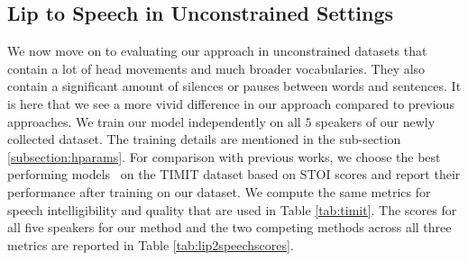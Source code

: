 \documentclass[10pt,twocolumn,letterpaper]{article}
\begin{document}
\subsection{Lip to Speech in Unconstrained Settings}
We now move on to evaluating our approach in unconstrained datasets that contain a lot of head movements and much broader vocabularies. They also contain a significant amount of silences or pauses between words and sentences. It is here that we see a more vivid difference in our approach compared to previous approaches. We train our model independently on all $5$ speakers of our newly collected \modelname dataset. The training details are mentioned in the sub-section \ref{subsection:hparams}. For comparison with previous works, we choose the best performing models~\cite{vougioukas2019video, Ephrat2017ImprovedSR} on the TIMIT dataset based on STOI scores and report their performance after training on our \modelname dataset. We compute the same metrics for speech intelligibility and quality that are used in Table \ref{tab:timit}. The scores for all five speakers for our method and the two competing methods across all three metrics are reported in Table \ref{tab:lip2speechscores}.
\end{document}
